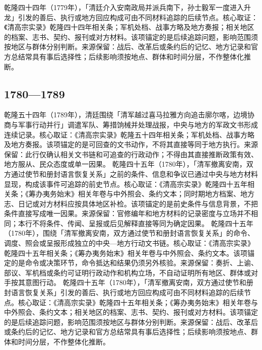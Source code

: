 乾隆四十四年（1779年），「清廷介入安南政局并派兵南下，孙士毅军一度进入升龙」引发的善后、执行或地方回应构成可由不同材料追踪的后续节点。核心取证：《清高宗实录》乾隆四十四年相关条；军机处档、战事方略及地方奏报；相关地区的档案、志书、契约、报刊或对方材料。该项锚定的是后续追踪问题，影响范围须按地区与群体分别判断。来源保留：战后、改革后或条约后的记忆、地方记录和官方总结常具有事后选择性；后续影响须按地点、群体和时间分层，不作整体化推断。
\subsection{1780—1789}
乾隆五十四年（1789年），清廷围绕「清军越过喜马拉雅方向追击廓尔喀，边境协商与军事行动并行」调遣军队、筹措饷械并处理战报，中央与地方的军政文书形成连续记录。核心取证：《清高宗实录》乾隆五十四年相关条；军机处档、战事方略及地方奏报。该项锚定的是可回查的文书动作，不将其直接等同于地方执行。来源保留：此行仅确认相关文书链和可追查的行政动作；不得由其直接推断政策有效、地方服从、民众态度或单一因果。
乾隆四十五年（1780年），「清军撤离安南，双方通过使节和册封语言恢复关系」之前的条件、信息和争议已通过中央与地方材料显现，构成该事件可追踪的前史节点。核心取证：《清高宗实录》乾隆四十五年相关条；《筹办夷务始末》相关年卷与中外照会、条约文本；同时期地方档案、地方志、日记或对方材料应按具体地区补检。该项锚定的是前史条件与信息背景，不把条件直接写成唯一因果。来源保留：官修编年和地方材料的记录密度与立场并不相同；本行不将条件、传闻、呈报或后见解释直接等同为确定因果。
乾隆四十五年（1780年），围绕「清军撤离安南，双方通过使节和册封语言恢复关系」的命令、调度、照会或呈报形成独立的中央—地方行动文书链。核心取证：《清高宗实录》乾隆四十五年相关条；《筹办夷务始末》相关年卷与中外照会、条约文本。该项锚定的是命令或决策环节，命令抵达和结果仍须另外核验。来源保留：奏折、上谕、部议、军机档或条约可证明行政动作和机构立场，不自动证明所有地区、群体或对手按其意图行动。
乾隆四十五年（1780年），「清军撤离安南，双方通过使节和册封语言恢复关系」引发的善后、执行或地方回应构成可由不同材料追踪的后续节点。核心取证：《清高宗实录》乾隆四十五年相关条；《筹办夷务始末》相关年卷与中外照会、条约文本；相关地区的档案、志书、契约、报刊或对方材料。该项锚定的是后续追踪问题，影响范围须按地区与群体分别判断。来源保留：战后、改革后或条约后的记忆、地方记录和官方总结常具有事后选择性；后续影响须按地点、群体和时间分层，不作整体化推断。
